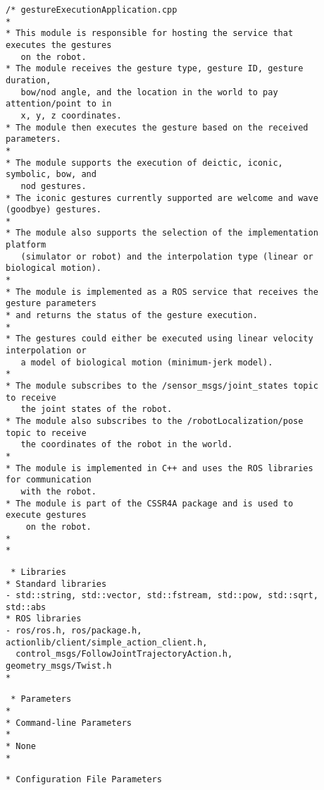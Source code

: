 \documentclass{CSSRforAfrica}
\newcommand{\checkboxChecked}{\fbox{\ding{51}}} %
\begin{document}
\begin{description}

\item[\checkboxChecked] 
 {\small 
\begin{verbatim}
/* gestureExecutionApplication.cpp
*
* This module is responsible for hosting the service that executes the gestures
   on the robot. 
* The module receives the gesture type, gesture ID, gesture duration, 
   bow/nod angle, and the location in the world to pay attention/point to in 
   x, y, z coordinates.
* The module then executes the gesture based on the received parameters. 
*
* The module supports the execution of deictic, iconic, symbolic, bow, and 
   nod gestures.
* The iconic gestures currently supported are welcome and wave (goodbye) gestures. 
* 
* The module also supports the selection of the implementation platform 
   (simulator or robot) and the interpolation type (linear or biological motion).
* 
* The module is implemented as a ROS service that receives the gesture parameters 
* and returns the status of the gesture execution.
*
* The gestures could either be executed using linear velocity interpolation or
   a model of biological motion (minimum-jerk model).
*
* The module subscribes to the /sensor_msgs/joint_states topic to receive 
   the joint states of the robot.
* The module also subscribes to the /robotLocalization/pose topic to receive 
   the coordinates of the robot in the world.
* 
* The module is implemented in C++ and uses the ROS libraries for communication 
   with the robot.
* The module is part of the CSSR4A package and is used to execute gestures 
    on the robot.
*
*
\end{verbatim}}

\item[\checkboxChecked] 
 {\small 
\begin{verbatim}
 * Libraries
* Standard libraries
- std::string, std::vector, std::fstream, std::pow, std::sqrt, std::abs
* ROS libraries
- ros/ros.h, ros/package.h, actionlib/client/simple_action_client.h, 
  control_msgs/FollowJointTrajectoryAction.h, geometry_msgs/Twist.h
*
\end{verbatim}}

\item[\checkboxChecked] 
 {\small 
\begin{verbatim}
 * Parameters
*
* Command-line Parameters
*
* None
*
\end{verbatim}}


\item[\checkboxChecked] 
 {\small 
\begin{verbatim}
* Configuration File Parameters


\end{verbatim}}
\end{description}
\end{document}
